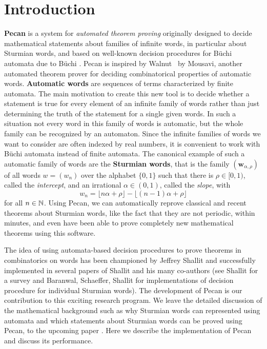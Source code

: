 \section{Introduction}

\textbf{Pecan} is a system for \emph{automated theorem proving} originally designed to decide mathematical statements about families of infinite words, in particular about Sturmian words, and based on well-known decision procedures for B\"uchi automata due to B\"uchi \cite{Buechi}. Pecan is inspired by Walnut~\cite{walnut} by Mousavi, another automated theorem prover for deciding combinatorical properties of automatic words. \textbf{Automatic words} are sequences of terms characterized by finite automata. The main motivation to create this new tool is to decide whether a statement is true for every element of an infinite family of words rather than just determining the truth of the statement for a single given words. In such a situation not every word in this family of words is automatic, but the whole family can be recognized by an automaton.
Since the infinite families of words we want to consider are often indexed by real numbers, it is convenient to work with B\"uchi automata instead of finite automata. The canonical example of such a automatic family of words are the \textbf{Sturmian words}, that is the family $(\mathbf{w}_{\alpha,\rho})$ of all words $w=(w_n)$ over the alphabet $\{0,1\}$ such that there is $\rho \in [ 0,1 )$, called the \emph{intercept}, and an irrational $\alpha \in (0,1)$, called the \emph{slope}, with
\[
w_{n}=\lfloor n\alpha +\rho\rfloor -\lfloor (n-1)\alpha +\rho\rfloor
\]
for all $n\in \mathbb{N}$. Using Pecan, we can automatically reprove classical and recent theorems about Sturmian words, like the fact that they are not periodic, within minutes, and even have been able to prove completely new mathematical theorems using this software. 

The idea of using automata-based decision procedures to prove theorems in combinatorics on words has been championed by Jeffrey Shallit and successfully implemented in several papers of Shallit and his many co-authors (see Shallit \cite{Shallit-survey} for a survey and Baranwal, Schaeffer, Shallit \cite{BARANWAL2021} for implementations of decision procedure for individual Sturmian words). The development of Pecan is our contribution to this exciting research program. We leave the detailed discussion of the mathematical background such as why Sturmian words can represented using automata and which statements about Sturmian words can be proved using Pecan, to the upcoming paper \cite{DecStuWor}. Here we describe the implementation of Pecan and discuss its performance.

